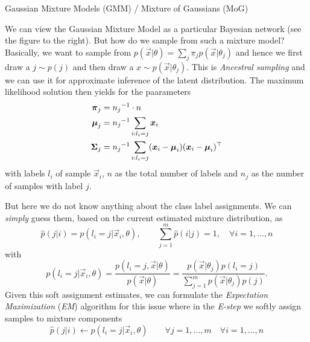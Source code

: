 \begin{topic}{0.3cm}{Gaussian Mixture Models (GMM) / Mixture of Gaussians (MoG)}
	\begin{minipage}[t]{1\textwidth}
		\begin{minipage}[t]{.58\textwidth}
			We can view the Gaussian Mixture Model as a particular Bayesian network (see the figure to the right). %
			But how do we sample from such a mixture model? %
			Basically, we want to sample from \ensuremath{ p(\vec{x}|\theta) = \sum_j \pi_j p(\vec{x}|\theta_j) } and hence we first draw a \ensuremath{ j\sim p(j) } and then draw a \ensuremath{ x\sim p(\vec{x}|\theta_j) }. %
			This is \emph{Ancestral sampling} and we can use it for approximate inference of the latent distribution. %
			The maximum likelihood solution then yields for the paarameters %
			\begin{align}
				\boldsymbol{\pi}_j &= {n_j}^{-1} \cdot n \\
				\boldsymbol{\mu}_j &= {n_j}^{-1} \sum_{i:l_i = j} \boldsymbol{x}_i \\
				\boldsymbol{\Sigma}_j &= {n_j}^{-1} \sum_{i:l_i=j} (\boldsymbol{x}_i - \boldsymbol{\mu}_i) (\boldsymbol{x}_i - \boldsymbol{\mu}_i)^\top
			\end{align}
			with labels \ensuremath{l_i} of sample \ensuremath{\vec{x}_i}, \ensuremath{n} as the total number of labels and \ensuremath{n_j} as the number of samples with label \ensuremath{j}. %
		\end{minipage}
		\hfill
		\begin{minipage}[t]{.38\textwidth}
		\end{minipage}
	\end{minipage}
	But here we do not know anything about the class label assignments. %
	We can \textit{simply} guess them, based on the current estimated mixture distribution, as %
	\begin{equation}
		\hat{p}(j|i) = p(l_i = j| \vec{x}_i,\theta), \qquad \sum_{j=1}^m \hat{p}(i|j) = 1, \quad \forall i = 1,\ldots, n
	\end{equation}
	with %
	\begin{equation}
	p(l_i = j| \vec{x}_i,\theta)
	= \frac{p(l_i = j,\vec{x}|\theta)}{p(\vec{x}|\theta)}
	= \frac{p(\vec{x}|\theta_j) p(l_i = j)}{\sum_{j=1}^m p(\vec{x}|\theta_j)p(j)}. %
	\end{equation}
	Given this soft assignment estimates, we can formulate the \emph{Expectation Maximization} (\emph{EM}) algorithm for this issue where in the \emph{E-step} we softly assign samples to mixture components %
	\begin{equation}
		\hat{p}(j|i) \leftarrow p(l_i=j|\vec{x}_i,\theta) \qquad \forall j = 1,\ldots,m \quad \forall i = 1,\ldots,n

\end{equation}
\end{topic}
